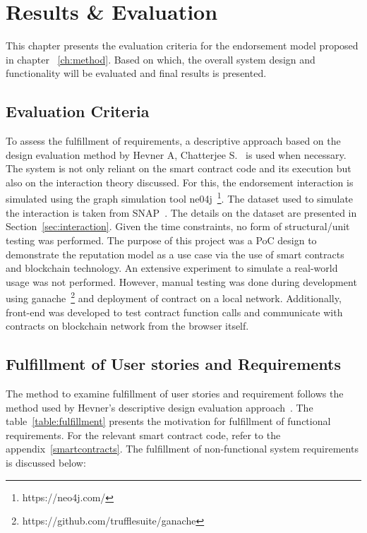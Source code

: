 \chapter{Results \& Evaluation} \label{ch:results}
This chapter presents the evaluation criteria for the endorsement model
proposed in chapter ~\ref{ch:method}. Based on which, the overall system design
and functionality will be evaluated and final results is presented. 

\section{Evaluation Criteria}
To assess the fulfillment of requirements, a descriptive approach based on the
design evaluation method by Hevner A, Chatterjee S.~\cite{hevner2010design} is
used when necessary. The system is not only reliant on the smart contract code
and its execution but also on the interaction theory discussed. For this, the
endorsement interaction is simulated using the graph simulation tool
ne04j~\footnote{https://neo4j.com/}. The dataset used to simulate the
interaction is taken from SNAP~\cite{snapnets}. The details on the dataset are
presented in Section~\ref{sec:interaction}. Given the time constraints, no form of
structural/unit testing was performed. The purpose of this project was a PoC
design to demonstrate the reputation model as a use case via the use of smart
contracts and blockchain technology. An extensive experiment to simulate a
real-world usage was not performed. However, manual testing was done during
development using ganache~\footnote{https://github.com/trufflesuite/ganache}
and deployment of contract on a local network. Additionally, front-end was
developed to test contract function calls and communicate with contracts on
blockchain network from the browser itself. 

\section{Fulfillment of User stories and Requirements}\label{fulfillment}
The method to examine fulfillment of user stories and requirement follows the
method used by Hevner's descriptive design evaluation
approach~\cite{hevner2010design}. The table~\ref{table:fulfillment} presents
the motivation for fulfillment of functional requirements. For the relevant
smart contract code, refer to the appendix~\ref{smartcontracts}. 
The fulfillment of non-functional system requirements is discussed below:
